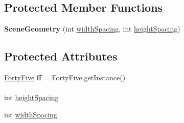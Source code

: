 \subsection*{Protected Member Functions}
\begin{DoxyCompactItemize}
\item 
\hypertarget{classdev_1_1boxy_1_1fortyfive_1_1core_1_1scene_1_1_scene_geometry_a40738f5424a7ab9c077fc57a32c6f29c}{
{\bfseries SceneGeometry} (int \hyperlink{group__scene_ga8116f4feebb544338d5cb2bb2f069cba}{widthSpacing}, int \hyperlink{group__scene_ga8b7cd33813c77386f79af2e54ba7ed34}{heightSpacing})}
\label{dd/d3e/classdev_1_1boxy_1_1fortyfive_1_1core_1_1scene_1_1_scene_geometry_a40738f5424a7ab9c077fc57a32c6f29c}

\end{DoxyCompactItemize}
\subsection*{Protected Attributes}
\begin{DoxyCompactItemize}
\item 
\hypertarget{classdev_1_1boxy_1_1fortyfive_1_1core_1_1scene_1_1_scene_geometry_a3708f4b4ced734fc2c44eac66d834f89}{
\hyperlink{classdev_1_1boxy_1_1fortyfive_1_1_forty_five}{FortyFive} {\bfseries ff} = FortyFive.getInstance()}
\label{dd/d3e/classdev_1_1boxy_1_1fortyfive_1_1core_1_1scene_1_1_scene_geometry_a3708f4b4ced734fc2c44eac66d834f89}

\end{DoxyCompactItemize}
\paragraph*{}
\begin{DoxyCompactItemize}
\item 
int \hyperlink{group__scene_ga8b7cd33813c77386f79af2e54ba7ed34}{heightSpacing}
\item 
int \hyperlink{group__scene_ga8116f4feebb544338d5cb2bb2f069cba}{widthSpacing}
\end{DoxyCompactItemize}



